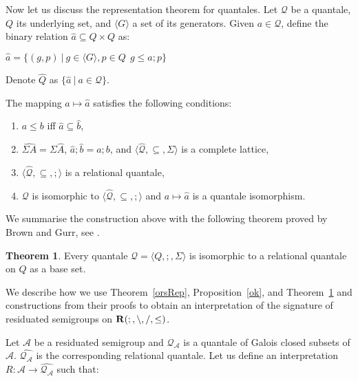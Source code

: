 \documentclass[a4paper]{article}
\theoremstyle{definition}
\theoremstyle{theorem}
\newtheorem{theorem}{Theorem}
\theoremstyle{proposition}
\theoremstyle{lemma}
\theoremstyle{ex}
\theoremstyle{corollary}
\theoremstyle{claim}
\begin{document}
Now let us discuss the representation theorem for quantales. Let $\mathcal{Q}$ be a quantale, $Q$ its underlying set, and $\langle G \rangle$ a set of its generators. Given $a \in \mathcal{Q}$, define the binary relation $\hat{a} \subseteq Q \times Q$ as:

\begin{center}
  $\hat{a} = \{ (g,p) \: | \: g \in \langle G \rangle, p \in Q \:\: g \leq a ; p \}$
\end{center}
Denote $\widehat{Q}$ as $\{ \hat{a} \: | \: a \in \mathcal{Q} \}$.

The mapping $a \mapsto \hat{a}$ satisfies the following conditions:

\begin{enumerate}
\item $a \leq b$ iff $\hat{a} \subseteq \hat{b}$,

\item $\widehat{\Sigma A} = \Sigma \widehat{A}$, $\hat{a} ; \hat{b} = \widehat{a ; b}$, and $\langle \widehat{\mathcal{Q}}, \subseteq, \Sigma \rangle$ is a complete lattice,

\item $\langle \widehat{\mathcal{Q}}, \subseteq, ; \rangle$ is a relational quantale,

\item $\mathcal{Q}$ is isomorphic to $\langle \widehat{\mathcal{Q}}, \subseteq, ; \rangle$ and $a \mapsto \hat{a}$ is a quantale isomorphism.
\end{enumerate}

We summarise the construction above with the following theorem proved by Brown and Gurr, see \cite[Theorem 3.11]{brown1993representation}.

\begin{theorem} \label{quantaleRep}
  Every quantale $\mathcal{Q} = \langle Q, ;, \Sigma \rangle$ is isomorphic to a relational quantale on $Q$ as a base set.
\end{theorem}

We describe how we use Theorem~\ref{orsRep}, Proposition~\ref{ok}, and Theorem~\ref{quantaleRep} and constructions from their proofs to obtain an interpretation of the signature of residuated semigroups on ${\bf R}(;, \setminus, /, \leq)$.

Let $\mathcal{A}$ be a residuated semigroup and $\mathcal{Q}_{\mathcal{A}}$ is a quantale of Galois closed subsets of $\mathcal{A}$. $\widehat{\mathcal{Q}_{\mathcal{A}}}$ is the corresponding relational quantale. Let us define an interpretation $R : \mathcal{A} \to \widehat{\mathcal{Q}_{\mathcal{A}}}$ such that:
\end{document}
